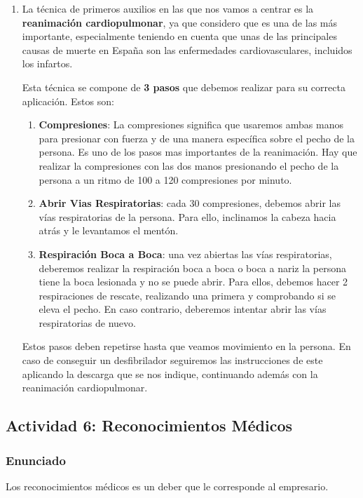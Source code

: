\begin{enumerate}[label=\alph*.]
    \item La técnica de primeros auxilios en las que nos vamos a centrar es la \textbf{reanimación cardiopulmonar}, ya que considero que es una de las más importante, especialmente teniendo en cuenta que unas de las principales causas de muerte en España son las enfermedades cardiovasculares, incluidos los infartos.

    Esta técnica se compone de \textbf{3 pasos} que debemos realizar para su correcta aplicación. Estos son:

    \begin{enumerate}
        \item \textbf{Compresiones}: La compresiones significa que usaremos ambas manos para presionar con fuerza y de una manera específica sobre el pecho de la persona. Es uno de los pasos mas importantes de la reanimación. Hay que realizar la compresiones con las dos manos presionando el pecho de la persona a un ritmo de 100 a 120 compresiones por minuto.

        \item \textbf{Abrir Vias Respiratorias}: cada 30 compresiones, debemos abrir las vías respiratorias de la persona. Para ello, inclinamos la cabeza hacia atrás y le levantamos el mentón.

        \item \textbf{Respiración Boca a Boca}: una vez abiertas las vías respiratorias, deberemos realizar la respiración boca a boca o boca a nariz la persona tiene la boca lesionada y no se puede abrir. Para ellos, debemos hacer 2 respiraciones de rescate, realizando una primera y comprobando si se eleva el pecho. En caso contrario, deberemos intentar abrir las vías respiratorias de nuevo.
    \end{enumerate}

    Estos pasos deben repetirse hasta que veamos movimiento en la persona. En caso de conseguir un desfibrilador seguiremos las instrucciones de este aplicando la descarga que se nos indique, continuando además con la reanimación cardiopulmonar.
\end{enumerate}

\subsection{Actividad 6: Reconocimientos Médicos}

\subsubsection{Enunciado}
Los reconocimientos médicos es un deber que le corresponde al empresario.

